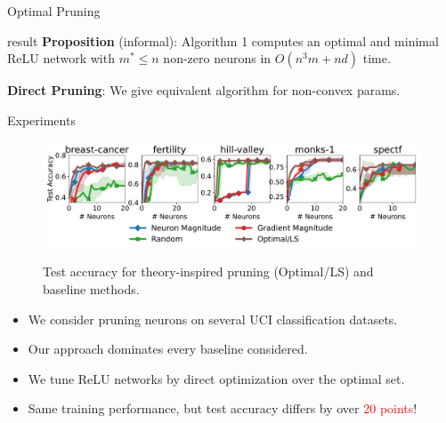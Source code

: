 \documentclass[12pt, usenames, dvipsnames]{beamer}
\newlength{\colwidth}
\newcommand{\red}[1]{\textcolor{Red}{#1}}
\newcommand{\blue}[1]{\textcolor{CBBlue}{#1}}
\begin{document}
\begin{frame}[t]
\begin{columns}[t]
\begin{column}{\colwidth}
\begin{block}{Optimal Pruning}
				\vspace{0.5em}

				

				\begin{beamercolorbox}[wd=\textwidth,sep=1em]{result}
					\textbf{Proposition} (informal):
					Algorithm 1 computes an optimal and minimal ReLU network with
					\( m^* \leq n \) non-zero neurons in
					\( O(n^3 m + nd) \) time.
				\end{beamercolorbox}

				\textbf{Direct Pruning}: We give equivalent algorithm
				for non-convex params.


			\end{block}
			\vspace{-1em}
			\begin{block}{Experiments}
				\large


				\begin{figure}[]
					\centering
					\includegraphics[width=\textwidth]{assets/uci_pruning_acc.pdf}
					\label{fig:purning}
					\vspace{-2em}
					\caption{Test accuracy for theory-inspired pruning (Optimal/LS) and baseline methods.}
				\end{figure}
				\vspace{-0.5em}
				\begin{itemize}
					\item We consider pruning neurons on several UCI
					      classification datasets.
					\item Our approach \blue{dominates} every baseline considered.
				\end{itemize}

				\vspace{-0.5em}
				
				\begin{itemize}
					\item We tune ReLU networks by direct optimization over the optimal set.
					\item Same training performance, but test accuracy differs by over \red{20 points}!
				\end{itemize}


\end{block}
\end{column}
\end{columns}
\end{frame}
\end{document}
